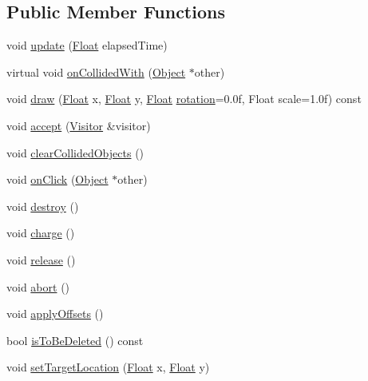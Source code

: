 \subsection*{Public Member Functions}
\begin{DoxyCompactItemize}
\item 
void \hyperlink{classZeta_1_1Projectile_a43eb183c50f2945ecf82cc4a8284abfa}{update} (\hyperlink{namespaceZeta_a1e0a1265f9b3bd3075fb0fabd39088ba}{Float} elapsed\+Time)
\item 
virtual void \hyperlink{classZeta_1_1Projectile_abc96b0d41f7f4e43dec4a30821bd67be}{on\+Collided\+With} (\hyperlink{classZeta_1_1Object}{Object} $\ast$other)
\item 
void \hyperlink{classZeta_1_1Projectile_aad582299efafe6e189c593b140f9e59b}{draw} (\hyperlink{namespaceZeta_a1e0a1265f9b3bd3075fb0fabd39088ba}{Float} x, \hyperlink{namespaceZeta_a1e0a1265f9b3bd3075fb0fabd39088ba}{Float} y, \hyperlink{namespaceZeta_a1e0a1265f9b3bd3075fb0fabd39088ba}{Float} \hyperlink{classZeta_1_1Projectile_ac8ea8a49b50c1e3ce011ca9e7a03ce3c}{rotation}=0.\+0f, Float scale=1.\+0f) const 
\item 
void \hyperlink{classZeta_1_1Projectile_acc983839b25b6f2722605b6d26f8de03}{accept} (\hyperlink{classZeta_1_1Visitor}{Visitor} \&visitor)
\item 
void \hyperlink{classZeta_1_1Projectile_a8fa00ff17b93b4a6073912e1e33da79a}{clear\+Collided\+Objects} ()
\item 
void \hyperlink{classZeta_1_1Projectile_af4c81d1a28f45fd5c54c9dd02f4d1282}{on\+Click} (\hyperlink{classZeta_1_1Object}{Object} $\ast$other)
\item 
void \hyperlink{classZeta_1_1Projectile_a9d12fc2a30bcabf19a87bef6d0ec4d0e}{destroy} ()
\item 
void \hyperlink{classZeta_1_1Projectile_ac261d2a8c2c8a1005f3848d231847ef7}{charge} ()
\item 
void \hyperlink{classZeta_1_1Projectile_a21ef4f7d9b80934bf4cfcac6cf0128f6}{release} ()
\item 
void \hyperlink{classZeta_1_1Projectile_ac24627f14ea0a0545b7113518bb9676e}{abort} ()
\item 
void \hyperlink{classZeta_1_1Projectile_a83f6af0f8bd17f89e95e388cdac9abad}{apply\+Offsets} ()
\item 
bool \hyperlink{classZeta_1_1Projectile_ad2a89d0808a541a372508812b4dfaf25}{is\+To\+Be\+Deleted} () const 
\item 
void \hyperlink{classZeta_1_1Projectile_ab87776cfb299513d683a5e2413884f6b}{set\+Target\+Location} (\hyperlink{namespaceZeta_a1e0a1265f9b3bd3075fb0fabd39088ba}{Float} x, \hyperlink{namespaceZeta_a1e0a1265f9b3bd3075fb0fabd39088ba}{Float} y)

\end{DoxyCompactItemize}

